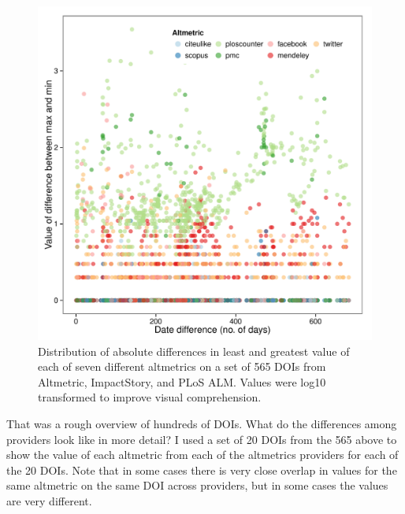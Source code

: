 \documentclass[letterpaper,superscriptaddress,showkeys,longbibliography]{revtex4-1}\usepackage{graphicx, color}
\newenvironment{knitrout}{}{} %
\begin{document}
\begin{knitrout}
\color{fgcolor}\begin{figure}[]


{\centering \includegraphics[width=.7\linewidth]{figure/dataconst_plot2} 

}

\caption[Distribution of absolute differences in least and greatest value of each of seven different altmetrics on a set of 565 DOIs from Altmetric, ImpactStory, and PLoS ALM]{Distribution of absolute differences in least and greatest value of each of seven different altmetrics on a set of 565 DOIs from Altmetric, ImpactStory, and PLoS ALM. Values were log10 transformed to improve visual comprehension.\label{fig:dataconst_plot2}}
\end{figure}


\end{knitrout}


That was a rough overview of hundreds of DOIs. What do the differences among providers look like in more detail? I used a set of 20 DOIs from the 565 above to show the value of each altmetric from each of the altmetrics providers for each of the 20 DOIs. Note that in some cases there is very close overlap in values for the same altmetric on the same DOI across providers, but in some cases the values are very different. 
\end{document}
